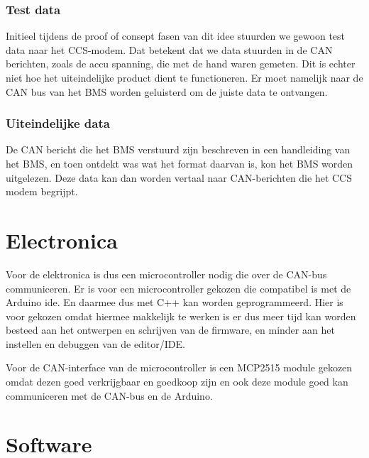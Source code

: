 \subsubsection{Test data}

Initieel tijdens de proof of consept fasen van dit idee stuurden we gewoon test
data naar het CCS-modem. Dat betekent dat we data stuurden in de CAN berichten,
zoals de accu spanning, die met de hand waren gemeten. Dit is echter niet hoe
het uiteindelijke product dient te functioneren. Er moet namelijk naar de CAN
bus van het BMS worden geluisterd om de juiste data te ontvangen.

\subsubsection{Uiteindelijke data}

De CAN bericht die het BMS verstuurd zijn beschreven in een handleiding van het
BMS, en toen ontdekt was wat het format daarvan is, kon het BMS worden
uitgelezen. Deze data kan dan worden vertaal naar CAN-berichten die het CCS
modem begrijpt.

\section{Electronica}

Voor de elektronica is dus een microcontroller nodig die over de CAN-bus
communiceren. Er is voor een microcontroller gekozen die compatibel is met de
Arduino \ac{ide}. En daarmee dus met C++ kan worden geprogrammeerd. Hier is
voor gekozen omdat hiermee makkelijk te werken is er dus meer tijd kan worden
besteed aan het ontwerpen en schrijven van de firmware, en minder aan het
instellen en debuggen van de editor/IDE.

Voor de CAN-interface van de microcontroller is een MCP2515 module gekozen
omdat dezen goed verkrijgbaar en goedkoop zijn en ook deze module goed kan
communiceren met de CAN-bus en de Arduino. \cite{canbord}

\section{Software}

